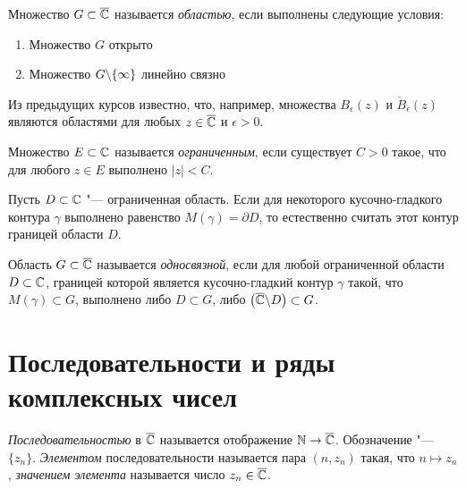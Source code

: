 \begin{definition}
	Множество $G \subset \overline{\mathbb{C}}$ называется \textit{областью}, если выполнены следующие условия:
	\begin{enumerate}
		\item Множество $G$ открыто
		\item Множество $G \backslash \{\infty\}$ линейно связно
	\end{enumerate}
\end{definition}

\begin{note}
	Из предыдущих курсов известно, что, например, множества $B_\epsilon(z)$ и $\mathring B_\epsilon(z)$ являются областями для любых $z \in \overline{\mathbb{C}}$ и $\epsilon > 0$.
\end{note}

\begin{definition}
	Множество $E \subset \mathbb{C}$ называется \textit{ограниченным}, если существует $C > 0$ такое, что для любого $z \in E$ выполнено $|z| < C$.
\end{definition}

\begin{note}
	Пусть $D \subset \mathbb{C}$ "--- ограниченная область. Если для некоторого кусочно-гладкого контура $\gamma$ выполнено равенство $M(\gamma) = \partial D$, то естественно считать этот контур границей области $D$.
\end{note}

\begin{definition}
	Область $G \subset \overline{\mathbb{C}}$ называется \textit{односвязной}, если для любой ограниченной области $D \subset \mathbb{C}$, границей которой является кусочно-гладкий контур $\gamma$ такой, что $M(\gamma) \subset G$, выполнено либо $D \subset G$, либо $\left(\overline{\mathbb{C}} \backslash D\right) \subset G$.
\end{definition}

\section{Последовательности и ряды комплексных чисел}

\begin{definition}
	\textit{Последовательностью} в $\overline{\mathbb{C}}$ называется отображение $\mathbb{N} \to \overline{\mathbb{C}}$. Обозначение "--- $\{z_n\}$. \textit{Элементом} последовательности называется пара $(n, z_n)$ такая, что $n \mapsto z_n$, \textit{значением элемента} называется число $z_n \in \overline{\mathbb{C}}$.
\end{definition}

